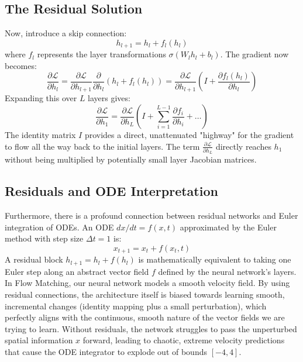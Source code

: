 \documentclass[12pt]{article}
\begin{document}
\subsection{The Residual Solution}
Now, introduce a skip connection:
\begin{equation}
    h_{l+1} = h_l + f_l(h_l)
\end{equation}
where $f_l$ represents the layer transformations $\sigma(W_l h_l + b_l)$. The gradient now becomes:
\begin{equation}
    \frac{\partial \mathcal{L}}{\partial h_l} = \frac{\partial \mathcal{L}}{\partial h_{l+1}} \frac{\partial}{\partial h_l} (h_l + f_l(h_l)) = \frac{\partial \mathcal{L}}{\partial h_{l+1}} \left( I + \frac{\partial f_l(h_l)}{\partial h_l} \right)
\end{equation}
Expanding this over $L$ layers gives:
\begin{equation}
    \frac{\partial \mathcal{L}}{\partial h_1} = \frac{\partial \mathcal{L}}{\partial h_L} \left( I + \sum_{i=1}^{L-1} \frac{\partial f_i}{\partial h_i} + \dots \right)
\end{equation}
The identity matrix $I$ provides a direct, unattenuated "highway" for the gradient to flow all the way back to the initial layers. The term $\frac{\partial \mathcal{L}}{\partial h_L}$ directly reaches $h_1$ without being multiplied by potentially small layer Jacobian matrices.

\subsection{Residuals and ODE Interpretation}
Furthermore, there is a profound connection between residual networks and Euler integration of ODEs. An ODE $dx/dt = f(x, t)$ approximated by the Euler method with step size $\Delta t = 1$ is:
\begin{equation}
    x_{t+1} = x_t + f(x_t, t)
\end{equation}
A residual block $h_{l+1} = h_l + f(h_l)$ is mathematically equivalent to taking one Euler step along an abstract vector field $f$ defined by the neural network's layers. In Flow Matching, our neural network models a smooth velocity field. By using residual connections, the architecture itself is biased towards learning smooth, incremental changes (identity mapping plus a small perturbation), which perfectly aligns with the continuous, smooth nature of the vector fields we are trying to learn. Without residuals, the network struggles to pass the unperturbed spatial information $x$ forward, leading to chaotic, extreme velocity predictions that cause the ODE integrator to explode out of bounds $[-4, 4]$.
\end{document}
